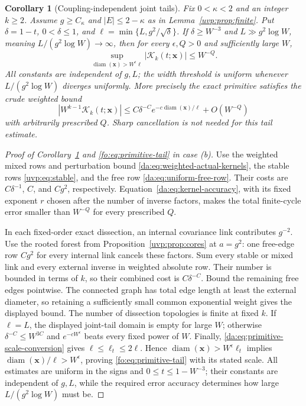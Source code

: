 \documentclass[11pt]{article}
\numberwithin{equation}{section}
\newtheorem{corollary}[theorem]{Corollary}
\theoremstyle{remark}
\newcommand{\diam}{\operatorname{diam}}
\begin{document}
\begin{corollary}[Coupling-independent joint tails]\label{uvp:cor:joint-tail}
Fix $0<\kappa<2$ and an integer $k\ge2$. Assume $g\ge C_\kappa$ and
$|E|\le2-\kappa$ as in Lemma~\ref{uvp:prop:finite}. Put
$\delta=1-t$, $0<\delta\le1$, and $\ell=\min\{L,g^2/\sqrt\delta\}$.
If $\delta\ge W^{-3}$ and $L\gg g^2\log W$, meaning
$L/(g^2\log W)\to\infty$, then for every $\epsilon,Q>0$ and sufficiently
large $W$,
\[
 \sup_{\diam(\boldsymbol x)>W^\epsilon\ell}
           |\mathcal K_k(t;\boldsymbol x)|\le W^{-Q}.
\]
All constants are independent of $g,L$; the width threshold is uniform
whenever $L/(g^2\log W)$ diverges uniformly.
More precisely the exact primitive satisfies the crude weighted bound
\[
 |W^{k-1}\mathcal K_k(t;\boldsymbol x)|
       \le C\delta^{-C}e^{-c\diam(\boldsymbol x)/\ell}
          +O(W^{-Q})
\]
with arbitrarily prescribed $Q$.  Sharp cancellation is not needed
for this tail estimate.
\end{corollary}
\begin{proof}[Proof of Corollary~\ref{uvp:cor:joint-tail} and
\eqref{fo:eq:primitive-tail} in case \textup{(b)}]
Use the weighted mixed rows and perturbation bound
\eqref{da:eq:weighted-actual-kernels}, the stable rows
\eqref{uvp:eq:stable}, and the free row \eqref{da:eq:uniform-free-row}.
Their costs are $C\delta^{-1}$, $C$, and $Cg^2$, respectively.
Equation~\eqref{da:eq:kernel-accuracy}, with its fixed exponent $r$
chosen after the number of inverse factors, makes the total finite-cycle
error smaller than $W^{-Q}$ for every prescribed $Q$.

In each fixed-order exact dissection, an internal covariance link
contributes $g^{-2}$.  Use the rooted forest from
Proposition~\ref{uvp:prop:cores} at $a=g^2$: one free-edge row $Cg^2$ for every
internal link cancels these factors.  Sum every stable or mixed
link and every external inverse in weighted absolute row.  Their
number is bounded in terms of $k$, so their combined cost is
$C\delta^{-C}$.  Bound the remaining free edges pointwise.
The connected graph has total edge length at least the external
diameter, so retaining a sufficiently small common exponential
weight gives the displayed bound.  The number of dissection
topologies is finite at fixed $k$.  If $\ell=L$, the displayed
joint-tail domain is empty for large $W$; otherwise
$\delta^{-C}\le W^{3C}$ and
$e^{-cW^\epsilon}$ beats every fixed power of $W$.
Finally, \eqref{da:eq:primitive-scale-conversion} gives
$\ell\le\ell_t\le2\ell$. Hence $\diam(\boldsymbol x)>W^\epsilon\ell_t$
implies $\diam(\boldsymbol x)/\ell>W^\epsilon$, proving
\eqref{fo:eq:primitive-tail} with its stated scale. All estimates are
uniform in the signs and $0\le t\le1-W^{-3}$; their constants are
independent of $g,L$, while the required error accuracy determines
how large $L/(g^2\log W)$ must be.
\end{proof}
\end{document}
